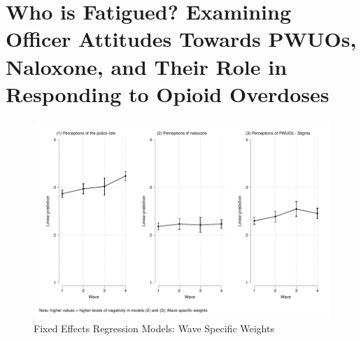 \chapter{Who is Fatigued? Examining Officer Attitudes Towards PWUOs, Naloxone, and Their Role in Responding to Opioid Overdoses}

\begin{figure}
    \centering
    \caption{\centering Fixed Effects Regression Models: Wave Specific Weights}
    \includegraphics{figures/growth-models-sens-weight.pdf}
\end{figure}



\newpage

\begin{landscape}
    
\end{landscape}


\newpage



\newpage

\begin{landscape}

\end{landscape}

\newpage


